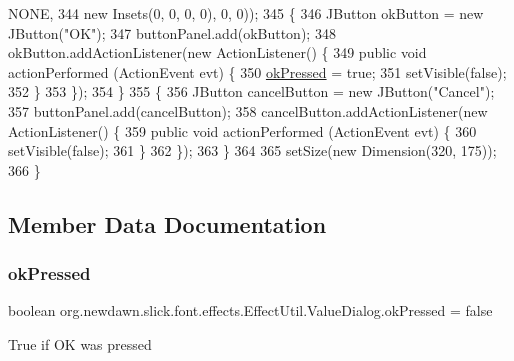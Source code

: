 \begin{DoxyCode}
      NONE,
344                     \textcolor{keyword}{new} Insets(0, 0, 0, 0), 0, 0));
345             \{
346                 JButton okButton = \textcolor{keyword}{new} JButton(\textcolor{stringliteral}{"OK"});
347                 buttonPanel.add(okButton);
348                 okButton.addActionListener(\textcolor{keyword}{new} ActionListener() \{
349                     \textcolor{keyword}{public} \textcolor{keywordtype}{void} actionPerformed (ActionEvent evt) \{
350                         \mbox{\hyperlink{classorg_1_1newdawn_1_1slick_1_1font_1_1effects_1_1_effect_util_1_1_value_dialog_ad9cf435423031592402344dec1314245}{okPressed}} = \textcolor{keyword}{true};
351                         setVisible(\textcolor{keyword}{false});
352                     \}
353                 \});
354             \}
355             \{
356                 JButton cancelButton = \textcolor{keyword}{new} JButton(\textcolor{stringliteral}{"Cancel"});
357                 buttonPanel.add(cancelButton);
358                 cancelButton.addActionListener(\textcolor{keyword}{new} ActionListener() \{
359                     \textcolor{keyword}{public} \textcolor{keywordtype}{void} actionPerformed (ActionEvent evt) \{
360                         setVisible(\textcolor{keyword}{false});
361                     \}
362                 \});
363             \}
364 
365             setSize(\textcolor{keyword}{new} Dimension(320, 175));
366         \}
\end{DoxyCode}


\subsection{Member Data Documentation}
\mbox{\label{classorg_1_1newdawn_1_1slick_1_1font_1_1effects_1_1_effect_util_1_1_value_dialog_ad9cf435423031592402344dec1314245}} 
\subsubsection{\texorpdfstring{ok\+Pressed}{okPressed}}
{\footnotesize\ttfamily boolean org.\+newdawn.\+slick.\+font.\+effects.\+Effect\+Util.\+Value\+Dialog.\+ok\+Pressed = false}

True if OK was pressed 